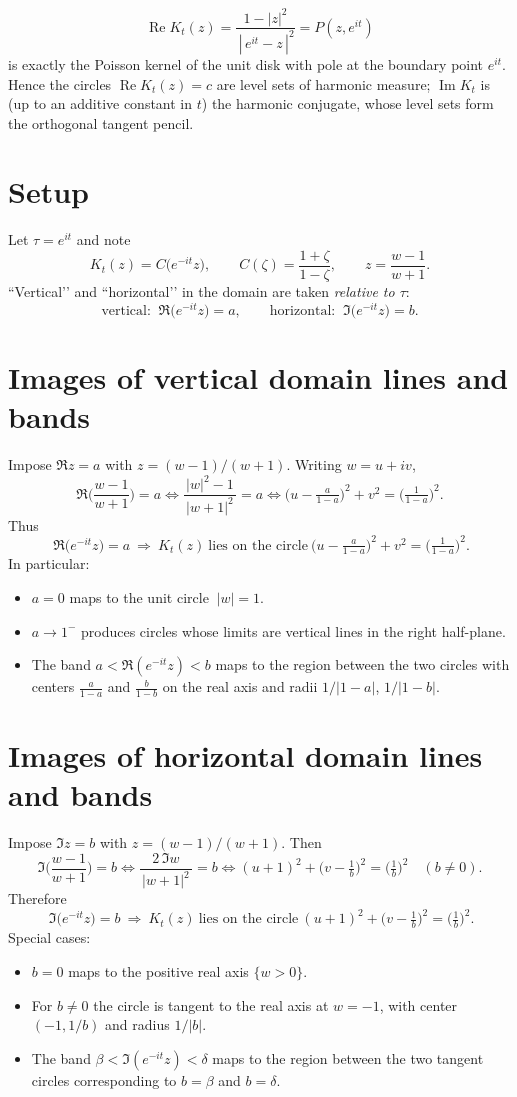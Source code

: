 \documentclass[11pt]{article}
\begin{document}
	\[
	\boxed{\ \operatorname{Re} K_t(z)=\frac{1-|z|^2}{\,|\,e^{it}-z\,|^2}=P(z,e^{it})\ }
	\]
	is exactly the Poisson kernel of the unit disk with pole at the boundary point $e^{it}$.
	Hence the circles $\operatorname{Re} K_t(z)=c$ are level sets of harmonic measure;
	$\operatorname{Im} K_t$ is (up to an additive constant in $t$) the harmonic conjugate, whose level sets form the orthogonal tangent pencil.	
	
	
\section*{Setup}
Let $\tau=e^{it}$ and note
\[
K_t(z)=C\!\big(e^{-it}z\big), \qquad C(\zeta)=\frac{1+\zeta}{1-\zeta},\qquad
z=\frac{w-1}{w+1}.
\]
“Vertical’’ and “horizontal’’ in the domain are taken \emph{relative to $\tau$}:
\[
\text{vertical: }\ \Re\!\big(e^{-it}z\big)=a,
\qquad
\text{horizontal: }\ \Im\!\big(e^{-it}z\big)=b .
\]

\section*{Images of vertical domain lines and bands}
Impose $\Re z=a$ with $z=(w-1)/(w+1)$. Writing $w=u+iv$,
\[
\Re\!\Big(\frac{w-1}{w+1}\Big)=a
\iff
\frac{|w|^{2}-1}{\,|w+1|^{2}\,}=a
\iff
\big(u-\tfrac{a}{1-a}\big)^{2}+v^{2}=\Big(\tfrac{1}{1-a}\Big)^{2}.
\]
Thus
\[
\boxed{\ \Re\!\big(e^{-it}z\big)=a\ \Longrightarrow\ 
	K_t(z)\ \text{lies on the circle}\ 
	\big(u-\tfrac{a}{1-a}\big)^{2}+v^{2}=\big(\tfrac{1}{1-a}\big)^{2}. }
\]
In particular:
\begin{itemize}
	\item $a=0$ maps to the unit circle $\ |w|=1$.
	\item $a\to 1^{-}$ produces circles whose limits are vertical lines in the right half-plane.
	\item The band $a<\Re(e^{-it}z)<b$ maps to the region between the two circles
	with centers $\tfrac{a}{1-a}$ and $\tfrac{b}{1-b}$ on the real axis and radii $1/|1-a|$, $1/|1-b|$.
\end{itemize}

\section*{Images of horizontal domain lines and bands}
Impose $\Im z=b$ with $z=(w-1)/(w+1)$. Then
\[
\Im\!\Big(\frac{w-1}{w+1}\Big)=b
\iff
\frac{2\,\Im w}{\,|w+1|^{2}\,}=b
\iff
(u+1)^{2}+\Big(v-\tfrac{1}{b}\Big)^{2}=\Big(\tfrac{1}{b}\Big)^{2}\quad (b\neq0).
\]
Therefore
\[
\boxed{\ \Im\!\big(e^{-it}z\big)=b\ \Longrightarrow\ 
	K_t(z)\ \text{lies on the circle}\ 
	(u+1)^{2}+\big(v-\tfrac{1}{b}\big)^{2}=\big(\tfrac{1}{b}\big)^{2}. }
\]
Special cases:
\begin{itemize}
	\item $b=0$ maps to the positive real axis $\{w>0\}$.
	\item For $b\neq0$ the circle is tangent to the real axis at $w=-1$, with center $(-1,1/b)$ and radius $1/|b|$.
	\item The band $\beta<\Im(e^{-it}z)<\delta$ maps to the region between the two tangent circles corresponding to $b=\beta$ and $b=\delta$.
\end{itemize}
\end{document}

